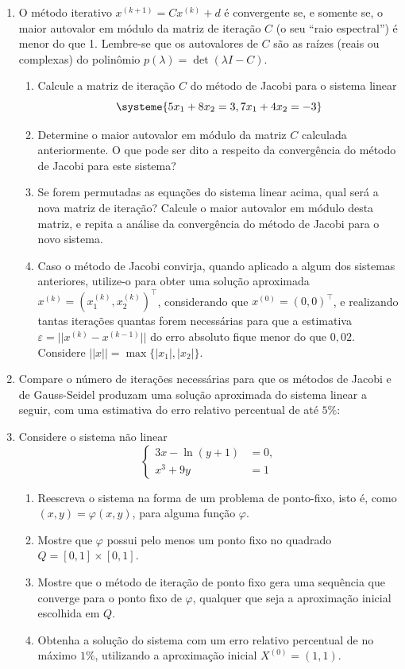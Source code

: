 \documentclass[12pt,a4paper]{article}
\begin{document}
\begin{enumerate}
\item O método iterativo $x^{(k+1)} = C x^{(k)} + d$ é convergente se, e somente se, o maior autovalor em módulo da matriz de iteração $C$ (o seu ``raio espectral'') é menor do que 1. Lembre-se que os autovalores de $C$ são as raízes (reais ou complexas) do polinômio $p( \lambda ) = \det( \lambda I - C)$.
\begin{enumerate}
\item Calcule a matriz de iteração $C$ do método de Jacobi para o sistema linear
\[
\systeme{
5x_1 + 8x_2 =  3,
7x_1 + 4x_2 = -3
}
\]
\item Determine o maior autovalor em módulo da matriz $C$ calculada anteriormente. O que pode ser dito a respeito da convergência do método de Jacobi para este sistema?
\item Se forem permutadas as equações do sistema linear acima, qual será a nova matriz de iteração? Calcule o maior autovalor em módulo desta matriz, e repita a análise da convergência do método de Jacobi para o novo sistema.
\item Caso o método de Jacobi convirja, quando aplicado a algum dos sistemas anteriores, utilize-o para obter uma solução aproximada $x^{(k)} = \left(x_1^{(k)}, x_2^{(k)}\right)^\intercal$, considerando que $x^{(0)} = (0, 0)^\intercal$, e realizando tantas iterações quantas forem necessárias para que a estimativa $\varepsilon = || x^{(k)} - x^{(k-1)} ||$ do erro absoluto fique menor do que $0,02$. Considere $|| x || = \max\{|x_1|, |x_2|\}$.
\end{enumerate}
\item Compare o número de iterações necessárias para que os métodos de Jacobi e de Gauss-Seidel produzam uma solução aproximada do sistema linear a seguir, com uma estimativa do erro relativo percentual de até $5\%$:

\item Considere o sistema não linear
\[
\begin{cases}
3x - \ln(y + 1) &= 0,\\
x^3 + 9y &= 1
\end{cases}
\]
\begin{enumerate}
\item Reescreva o sistema na forma de um problema de ponto-fixo, isto é, como $(x,y) = \varphi(x,y)$, para alguma função $\varphi$.
\item Mostre que $\varphi$ possui pelo menos um ponto fixo no quadrado $Q = [0,1] \times [0,1]$.
\item Mostre que o método de iteração de ponto fixo gera uma sequência que converge para o ponto fixo de $\varphi$, qualquer que seja a aproximação inicial escolhida em $Q$.
\item Obtenha a solução do sistema com um erro relativo percentual de no máximo $1\%$, utilizando a aproximação inicial $X^{(0)} = (1, 1)$.
\end{enumerate}
\end{enumerate}
\end{document}

